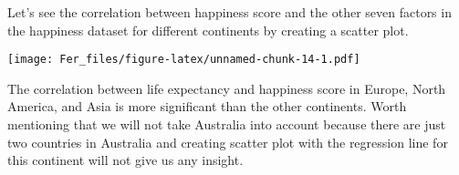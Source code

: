 \documentclass[
]{article}
\newenvironment{Shaded}{\begin{snugshade}}{\end{snugshade}}
\newcommand{\AttributeTok}[1]{\textcolor[rgb]{0.13,0.29,0.53}{#1}}
\newcommand{\ConstantTok}[1]{\textcolor[rgb]{0.56,0.35,0.01}{#1}}
\newcommand{\DecValTok}[1]{\textcolor[rgb]{0.00,0.00,0.81}{#1}}
\newcommand{\FloatTok}[1]{\textcolor[rgb]{0.00,0.00,0.81}{#1}}
\newcommand{\FunctionTok}[1]{\textcolor[rgb]{0.13,0.29,0.53}{\textbf{#1}}}
\newcommand{\NormalTok}[1]{#1}
\newcommand{\SpecialCharTok}[1]{\textcolor[rgb]{0.81,0.36,0.00}{\textbf{#1}}}
\newcommand{\StringTok}[1]{\textcolor[rgb]{0.31,0.60,0.02}{#1}}
\begin{document}
Let's see the correlation between happiness score and the other seven
factors in the happiness dataset for different continents by creating a
scatter plot.

\begin{Shaded}
\end{Shaded}

\texttt{[image: Fer\_files/figure-latex/unnamed-chunk-14-1.pdf]}

The correlation between life expectancy and happiness score in Europe,
North America, and Asia is more significant than the other continents.
Worth mentioning that we will not take Australia into account because
there are just two countries in Australia and creating scatter plot with
the regression line for this continent will not give us any insight.
\end{document}
